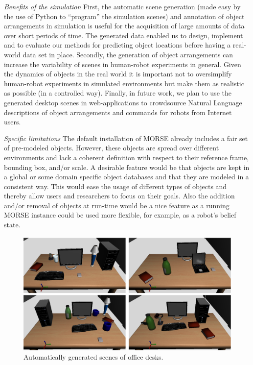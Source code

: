 \documentclass{llncs}
\begin{document}
\emph{Benefits of the simulation} First, the automatic scene generation (made
easy by the use of Python to ``program'' the simulation scenes) and annotation
of object arrangements in simulation is useful for the acquisition of large
amounts of data over short periods of time. The generated data enabled us to
design, implement and to evaluate our methods for predicting object locations
before having a real-world data set in place. Secondly, the generation of object
arrangements can increase the variability of scenes in human-robot experiments
in general. Given the dynamics of objects in the real world it is important not
to oversimplify human-robot experiments in simulated environments but make them
as realistic as possible (in a controlled way). Finally, in future work, we plan
to use the generated desktop scenes in web-applications to crowdsource Natural
Language descriptions of object arrangements and commands for robots from
Internet users.

\emph{Specific limitations} The default installation of MORSE already includes a
fair set of pre-modeled objects. However, these objects are spread over
different environments and lack a coherent definition with respect to their
reference frame, bounding box, and/or scale. A desirable feature would be that
objects are kept in a global or some domain specific object databases and that
they are modeled in a consistent way. This would ease the usage of different
types of objects and thereby allow users and researchers to focus on their
goals. Also the addition and/or removal of objects at run-time would be a nice
feature as a running MORSE instance could be used more flexible, for example,
as a robot's belief state.

\begin{figure}[t]
  \centering
  \includegraphics[width=.7\columnwidth]{figs/scenes.png}
  \caption{Automatically generated scenes of office desks.}
  \label{fig:simulated-desktop-scenes}
\end{figure}
\end{document}
